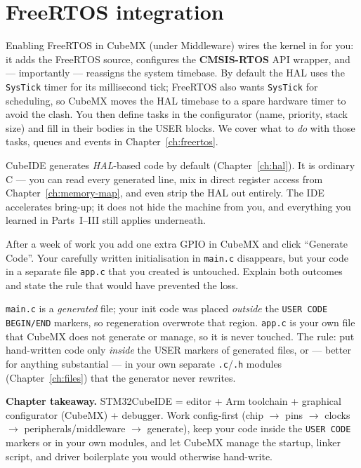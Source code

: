 \documentclass[11pt,a4paper,oneside]{book}
\newcommand{\code}[1]{\texttt{#1}}
\begin{document}
\section{FreeRTOS integration}
Enabling FreeRTOS in CubeMX (under Middleware) wires the kernel in for you:
it adds the FreeRTOS source, configures the \textbf{CMSIS-RTOS} API wrapper, and
--- importantly --- reassigns the system timebase. By default the HAL uses the
\code{SysTick} timer for its millisecond tick; FreeRTOS also wants \code{SysTick}
for scheduling, so CubeMX moves the HAL timebase to a spare hardware timer to
avoid the clash. You then define tasks in the configurator (name, priority, stack
size) and fill in their bodies in the USER blocks. We cover what to \emph{do}
with those tasks, queues and events in Chapter~\ref{ch:freertos}.

\begin{note}
CubeIDE generates \emph{HAL}-based code by default (Chapter~\ref{ch:hal}). It is
ordinary C --- you can read every generated line, mix in direct register access
from Chapter~\ref{ch:memory-map}, and even strip the HAL out entirely. The IDE
accelerates bring-up; it does not hide the machine from you, and everything you
learned in Parts~I--III still applies underneath.
\end{note}

\begin{exercise}
After a week of work you add one extra GPIO in CubeMX and click ``Generate
Code''. Your carefully written initialisation in \code{main.c} disappears, but
your code in a separate file \code{app.c} that you created is untouched. Explain
both outcomes and state the rule that would have prevented the loss.
\end{exercise}
\begin{solution}
\code{main.c} is a \emph{generated} file; your init code was placed
\emph{outside} the \code{USER CODE BEGIN/END} markers, so regeneration
overwrote that region. \code{app.c} is your own file that CubeMX does not
generate or manage, so it is never touched. The rule: put hand-written code only
\emph{inside} the USER markers of generated files, or --- better for anything
substantial --- in your own separate \code{.c}/\code{.h} modules
(Chapter~\ref{ch:files}) that the generator never rewrites.
\end{solution}

\begin{keyidea}
\textbf{Chapter takeaway.} STM32CubeIDE = editor + Arm toolchain + graphical
configurator (CubeMX) + debugger. Work config-first (chip $\to$ pins $\to$ clocks
$\to$ peripherals/middleware $\to$ generate), keep your code inside the
\code{USER CODE} markers or in your own modules, and let CubeMX manage the
startup, linker script, and driver boilerplate you would otherwise hand-write.
\end{keyidea}
\end{document}
